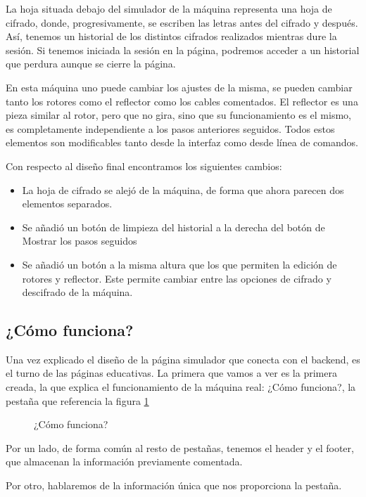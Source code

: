 La hoja situada debajo del simulador de la máquina representa una hoja de cifrado, donde, progresivamente, se escriben las letras antes del cifrado y después. Así, tenemos un historial de los distintos cifrados realizados mientras dure la sesión. Si tenemos iniciada la sesión en la página, podremos acceder a un historial que perdura aunque se cierre la página.

En esta máquina uno puede cambiar los ajustes de la misma, se pueden cambiar tanto los rotores como el reflector como los cables comentados. El reflector es una pieza similar al rotor, pero que no gira, sino que su funcionamiento es el mismo, es completamente independiente a los pasos anteriores seguidos. Todos estos elementos son modificables tanto desde la interfaz como desde línea de comandos. 

Con respecto al diseño final encontramos los siguientes cambios:
\begin{itemize}
	\item La hoja de cifrado se alejó de la máquina, de forma que ahora parecen dos elementos separados.
	\item Se añadió un botón de limpieza del historial a la derecha del botón de Mostrar los pasos seguidos
	\item Se añadió un botón a la misma altura que los que permiten la edición de rotores y reflector. Este permite cambiar entre las opciones de cifrado y descifrado de la máquina.
\end{itemize}

\subsection{¿Cómo funciona?}

Una vez explicado el diseño de la página simulador que conecta con el backend, es el turno de las páginas educativas. La primera que vamos a ver es la primera creada, la que explica el funcionamiento de la máquina real: ¿Cómo funciona?, la pestaña que referencia la figura \ref{funcionamiento}

\begin{figure}[htbp]
	\centerline{}
	\caption{¿Cómo funciona?}
	\label{funcionamiento}
\end{figure}

Por un lado, de forma común al resto de pestañas, tenemos el header y el footer, que almacenan la información previamente comentada.

Por otro, hablaremos de la información única que nos proporciona la pestaña. 

